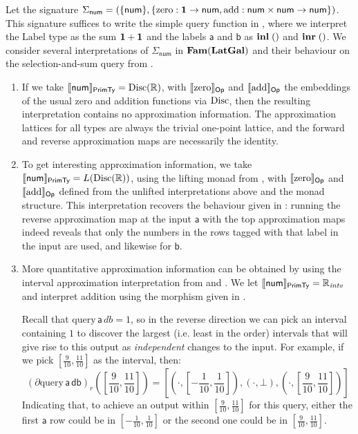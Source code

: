 Let the signature
$\Sigma_{\mathsf{num}} = (\{\mathsf{num}\}, \{\mathrm{zero} : \mathbf{1} \to \mathsf{num}, \mathrm{add} :
\mathsf{num} \times \mathsf{num} \to \mathsf{num}\})$. This signature suffices to write the simple query
function in , where we interpret the $\mathrm{Label}$ type as the sum
$\mathbf{1} + \mathbf{1}$ and the labels $\mathsf{a}$ and $\mathsf{b}$ as $\mathbf{inl}\;()$ and
$\mathbf{inr}\;()$. We consider several interpretations of $\Sigma_{\mathsf{num}}$ in $\mathbf{Fam}(\mathbf{LatGal})$ and their
behaviour on the selection-and-sum query from .
\begin{enumerate}
\item If we take $\llbracket \mathsf{num} \rrbracket_{\mathsf{PrimTy}} = \mathrm{Disc}(\mathbb{R})$, with $\llbracket \mathrm{zero} \rrbracket_{\mathsf{Op}}$ and
  $\llbracket \mathrm{add} \rrbracket_{\mathsf{Op}}$ the embeddings of the usual zero and addition functions via $\mathrm{Disc}$, then the
  resulting interpretation contains no approximation information. The approximation lattices for all types are
  always the trivial one-point lattice, and the forward and reverse approximation maps are necessarily the
  identity.
\item To get interesting approximation information, we take
  $\llbracket \mathsf{num} \rrbracket_{\mathsf{PrimTy}} = L(\mathrm{Disc}(\mathbb{R}))$, using the lifting monad from
  , with $\llbracket \mathrm{zero} \rrbracket_{\mathsf{Op}}$ and
  $\llbracket \mathrm{add} \rrbracket_{\mathsf{Op}}$ defined from the unlifted interpretations above and the monad structure. This
  interpretation recovers the behaviour given in : running the reverse
  approximation map at the input $\mathsf{a}$ with the top approximation maps indeed reveals that only the
  numbers in the rows tagged with that label in the input are used, and likewise for $\mathsf{b}$.
\item More quantitative approximation information can be obtained by using the interval approximation
  interpretation from  and . We let
  $\llbracket \mathsf{num} \rrbracket_{\mathsf{PrimTy}} = \mathbb{R}_{\mathit{intv}}$ and interpret addition using the morphism given
  in .

  Recall that $\mathrm{query}\,\mathsf{a}\,\mathit{db} = 1$, so in the reverse direction we can pick an
  interval containing $1$ to discover the largest (i.e. least in the order) intervals that will give rise to
  this output as \emph{independent} changes to the input. For example, if we pick
  $[\frac{9}{10},\frac{11}{10}]$ as the interval, then:
  \begin{displaymath}
    (\partial\mathrm{query}\,\mathsf{a}\,\mathsf{db})_r([\frac{9}{10},\frac{11}{10}]) = [(\cdot,[-\frac{1}{10},\frac{1}{10}]),(\cdot,\bot),(\cdot,[\frac{9}{10},\frac{11}{10}])]
  \end{displaymath}
  Indicating that, to achieve an output within $[\frac{9}{10},\frac{11}{10}]$ for this query, either the first
  $\mathsf{a}$ row could be in $[-\frac{1}{10},\frac{1}{10}]$ or the second one could be in
  $[\frac{9}{10},\frac{11}{10}]$.
\end{enumerate}

